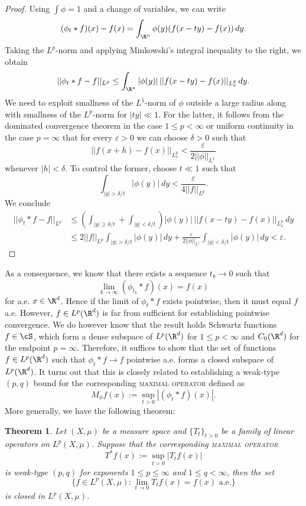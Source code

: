 \documentclass[reqno]{amsart}
\newtheorem{theorem}{Theorem}
\theoremstyle{definition}
\theoremstyle{remark}
\renewcommand{\epsilon}{\varepsilon}
\renewcommand{\emph}{\textsc}
\begin{document}
\begin{proof}
	Using $\int \phi = 1$ and a change of variables, we can write
		\[ (\phi_t * f)(x) - f(x) = \int_{\R^n} \phi(y) (f(x - ty) - f(x)) \, dy. \]
	Taking the $L^p$-norm and applying Minkowski's integral inequality to the right, we obtain	
		\[ ||\phi_t * f - f||_{L^p} \leq \int_{\R^n} |\phi(y)| \, ||f (x - ty) - f(x)||_{L^p_x} \, dy. \]
	We need to exploit smallness of the $L^1$-norm of $\phi$ outside a large radius along with smallness of the $L^p$-norm for $|ty| \ll 1$. For the latter, it follows from the dominated convergence theorem in the case $1 \leq p < \infty$ or uniform continuity in the case $p = \infty$ that for every $\epsilon > 0$ we can choose $\delta > 0$ such that 
		\[ || f (x + h) - f(x)||_{L^p_x} < \frac{\epsilon}{2 ||\phi||_{L^1}} \]
	whenever $|h| < \delta$. To control the former, choose $t \ll 1$ such that
		\[ \int_{|y| > \delta/t} |\phi(y)| \, dy < \frac{\epsilon}{4 ||f||_{L^p}}. \]
	We conclude
		\begin{align*}
			 ||\phi_t * f - f||_{L^p}
			 	&\leq
			 	\left( \int_{|y| \geq \delta/t} + \int_{|y| < \delta/t}\right) |\phi(y)| \, ||f (x - ty) - f(x)||_{L^p_x} \, dy\\
			 &	\leq 2|| f||_{L^p} \int_{|y| > \delta/t} |\phi(y)| \, dy + \frac{\epsilon}{2 ||\phi||_{L^1}} \int_{|y| < \delta/t} |\phi(y)| \, dy < \epsilon.
		\end{align*}
\end{proof}

As a consequence, we know that there exists a sequence $t_k \to 0$ such that 
		\[ \lim_{k \to \infty} (\phi_{t_k} * f)(x) = f(x) \]
	for a.e. $x \in \R^d$. Hence if the limit of $\phi_t * f$ exists pointwise, then it must equal $f$ a.e. However, $f \in L^p (\R^d)$ is far from sufficient for establishing pointwise convergence. We do however know that the result holds Schwartz functions $f \in \cS$, which form a dense subspace of $L^p (\R^d)$ for $1 \leq p < \infty$ and $C_0 (\R^d)$ for the endpoint $p = \infty$. Therefore, it suffices to show that the set of functions $f \in L^p (\R^d)$ such that $\phi_t * f \to f$ pointwise a.e. forms a closed subspace of $L^p (\R^d)$. It turns out that this is closely related to establishing a weak-type $(p, q)$ bound for the corresponding \emph{maximal operator} defined as	
	\[ M_\phi f (x) := \sup_{t > 0} |(\phi_t * f) (x)|. \]
More generally, we have the following theorem:


\begin{theorem}
	Let $(X, \mu)$ be a measure space and $\{ T_t \}_{t > 0}$ be a family of linear operators on $L^p (X, \mu)$. Suppose that the corresponding \emph{maximal operator}
		\[ T^* f (x) := \sup_{t > 0} |T_t f(x)| \]
	is weak-type $(p, q)$ for exponents $1 \leq p \leq \infty$ and $1 \leq q < \infty$, then the set
		\[ \{ f \in L^p (X, \mu) : \lim_{t \to 0} T_t f(x) = f(x) \text{ a.e.} \} \]
	is closed in $L^p (X, \mu)$. \label{thm:approxidentity}
\end{theorem}
\end{document}
